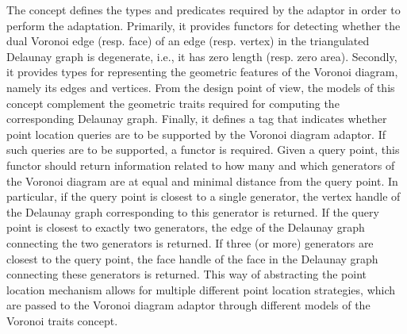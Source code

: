 The  concept defines the types and
predicates required by the adaptor in order to perform the
adaptation.
%
Primarily, it provides functors for detecting whether the dual Voronoi
edge (resp. face) of an edge (resp. vertex) in the triangulated
Delaunay graph is degenerate, i.e., it has zero length (resp. zero
area). Secondly, it provides types for representing the 
geometric features of the Voronoi diagram, namely its edges and
vertices. From the design point of view, the models of this concept
complement the geometric traits required for computing the
corresponding Delaunay graph.
%
Finally, it defines a tag that indicates whether point
location queries are to be supported by the Voronoi diagram
adaptor. If such queries are to be supported, a functor is
required. Given a query point, this functor should return information
related to how many and which generators of the Voronoi diagram are at
equal and minimal distance from the query point. In particular, if the
query point is closest to a single generator, the vertex handle of the
Delaunay graph corresponding to this generator is returned. If the
query point is closest to exactly two generators, the edge of the
Delaunay graph connecting the two generators is returned. If three (or
more) generators are closest to the query point, the face handle of
the face in the Delaunay graph connecting these generators is
returned. This way of abstracting the point location mechanism allows
for multiple different point location strategies, which are passed to
the Voronoi diagram adaptor through different models of the Voronoi
traits concept.
